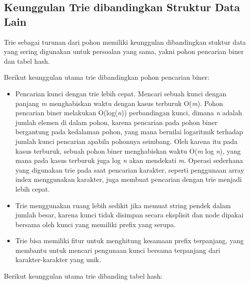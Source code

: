 \subsection{Keunggulan Trie dibandingkan Struktur Data Lain}
\label{sec:keunggulanTrie}

Trie sebagai turunan dari pohon memiliki keunggulan dibandingkan stuktur data yang sering digunakan untuk persoalan yang sama, yakni pohon pencarian biner dan tabel hash.

Berikut keunggulan utama trie dibandingkan pohon pencarian biner:

\begin{itemize}
	\item Pencarian kunci dengan trie lebih cepat. Mencari sebuah kunci dengan panjang \textit{m} menghabiskan waktu dengan kasus terburuk O(\textit{m}). Pohon pencarian biner melakukan O(log(\textit{n})) perbandingan kunci, dimana \textit{n} adalah jumlah elemen di dalam pohon, karena pencarian pada pohon biner bergantung pada kedalaman pohon, yang mana bernilai logaritmik terhadap jumlah kunci pencarian apabila pohonnya seimbang. Oleh karena itu pada kasus terburuk, sebuah pohon biner menghabiskan waktu O(\textit{m} log \textit{n}), yang mana pada kasus terburuk juga log \textit{n} akan mendekati \textit{m}. Operasi sederhana yang digunakan trie pada saat pencarian karakter, seperti penggunaan array index menggunakan karakter, juga membuat pencarian dengan trie menjadi lebih cepat.
	\item Trie menggunakan ruang lebih sedikit jika memuat string pendek dalam jumlah besar, karena kunci tidak disimpan secara eksplisit dan node dipakai bersama oleh kunci yang memiliki prefix yang serupa.
	\item Trie bisa memiliki fitur untuk menghitung kesamaan prefix terpanjang, yang membantu untuk mencari pengunaan kunci bersama terpanjang dari karakter-karakter yang unik.
\end{itemize}

Berikut keunggulan utama trie dibanding tabel hash:

